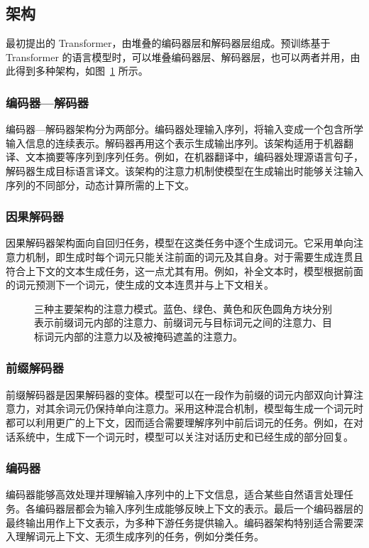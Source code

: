 \subsection{架构}
最初提出的 Transformer，由堆叠的编码器层和解码器层组成。预训练基于 Transformer 的语言模型时，可以堆叠编码器层、解码器层，也可以两者并用，由此得到多种架构，如图~\ref{fig:ch02-patterns} 所示。

\subsubsection{编码器—解码器}
编码器—解码器架构分为两部分。编码器处理输入序列，将输入变成一个包含所学输入信息的连续表示。解码器再用这个表示生成输出序列。该架构适用于机器翻译、文本摘要等序列到序列任务。例如，在机器翻译中，编码器处理源语言句子，解码器生成目标语言译文。该架构的注意力机制使模型在生成输出时能够关注输入序列的不同部分，动态计算所需的上下文。

\subsubsection{因果解码器}
因果解码器架构面向自回归任务，模型在这类任务中逐个生成词元。它采用单向注意力机制，即生成时每个词元只能关注前面的词元及其自身。对于需要生成连贯且符合上下文的文本生成任务，这一点尤其有用。例如，补全文本时，模型根据前面的词元预测下一个词元，使生成的文本连贯并与上下文相关。

\begin{figure}[!htbp]
\centering

\caption{三种主要架构的注意力模式。蓝色、绿色、黄色和灰色圆角方块分别表示前缀词元内部的注意力、前缀词元与目标词元之间的注意力、目标词元内部的注意力以及被掩码遮盖的注意力。}
\label{fig:ch02-patterns}
\end{figure}

\subsubsection{前缀解码器}
前缀解码器是因果解码器的变体。模型可以在一段作为前缀的词元内部双向计算注意力，对其余词元仍保持单向注意力。采用这种混合机制，模型每生成一个词元时都可以利用更广的上下文，因而适合需要理解序列中前后词元的任务。例如，在对话系统中，生成下一个词元时，模型可以关注对话历史和已经生成的部分回复。

\subsubsection{编码器}
编码器能够高效处理并理解输入序列中的上下文信息，适合某些自然语言处理任务。各编码器层都会为输入序列生成能够反映上下文的表示。最后一个编码器层的最终输出用作上下文表示，为多种下游任务提供输入。编码器架构特别适合需要深入理解词元上下文、无须生成序列的任务，例如分类任务。

